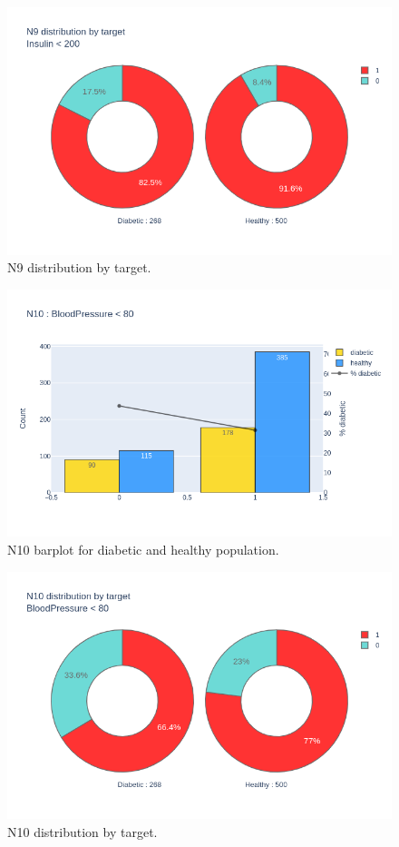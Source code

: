 \documentclass[12pt]{article}
\begin{document}
\begin{figure}[ht]
\centering
\includegraphics[width=1\textwidth]{newplot(33).png}
\caption{\label{fig:42} N9 distribution by target.}
\end{figure}

\begin{figure}[ht]
\centering
\includegraphics[width=1\textwidth]{newplot(34).png}
\caption{\label{fig:43} N10 barplot for diabetic and healthy population.}
\end{figure}

\begin{figure}[ht]
\centering
\includegraphics[width=1\textwidth]{newplot(35).png}
\caption{\label{fig:44} N10 distribution by target.}
\end{figure}
\end{document}
